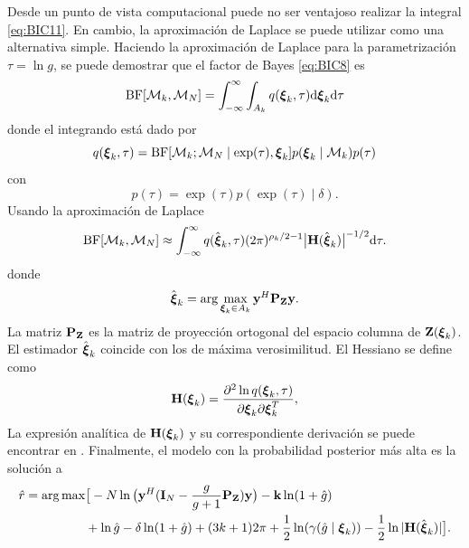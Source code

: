 Desde un punto de vista computacional puede no ser ventajoso realizar la integral \eqref{eq:BIC11}. En cambio, la aproximación de Laplace se puede utilizar como una alternativa simple. Haciendo la aproximación de Laplace para la parametrización $\tau = \ln g$, se puede demostrar que el factor de Bayes \eqref{eq:BIC8} es \cite{Nielsen2013}
\begin{equation}
	\mathrm{BF}[\mathcal{M}_k,\mathcal{M}_N] = \int_{-\infty}^{\infty}\int_{A_k}q(\boldsymbol{\xi}_k,\tau)\mathrm{d}\boldsymbol{\xi}_k\mathrm{d}\tau
\end{equation}
donde el integrando está dado por
\begin{equation}
	q(\boldsymbol{\xi}_k,\tau) = \mathrm{BF}[\mathcal{M}_k;\mathcal{M}_N\mid \exp(\tau),\boldsymbol{\xi}_k]p(\boldsymbol{\xi}_k\mid\mathcal{M}_k)p(\tau)
	\label{eq:BIC12}
\end{equation}
con
\[p(\tau) = \exp(\tau)p(\exp(\tau)\mid\delta).\]
Usando la aproximación de Laplace
\begin{equation}
	\mathrm{BF}[\mathcal{M}_k,\mathcal{M}_N] \approx \int_{-\infty}^{\infty} q(\hat{\boldsymbol{\xi}}_k,\tau)(2\pi)^{\rho_k/2-1}\big|\mathbf{H}(\hat{\boldsymbol{\xi}}_k)\big|^{-1/2}\mathrm{d}\tau.
	\label{eq:BIC13} 
\end{equation}
donde 
\begin{equation}
	\hat{\boldsymbol{\xi}}_k = \arg\max_{\boldsymbol{\xi}_k\in A_k}\mathbf{y}^H\mathbf{P}_{\mathbf{Z}}\mathbf{y}.
	\label{Eq:BIC16}
\end{equation}
La matriz $\mathbf{P}_{\mathbf{Z}}$ es la matriz de proyección ortogonal del espacio columna de $\mathbf{Z}(\boldsymbol{\xi}_k)$. El estimador $\hat{\boldsymbol{\xi}}_k$ coincide con los de máxima verosimilitud. El Hessiano se define como
\begin{equation}
	\mathbf{H}(\boldsymbol{\xi}_k) = \frac{\partial^2\ln q(\boldsymbol{\xi}_k,\tau)}{\partial\boldsymbol{\xi}_k\partial\boldsymbol{\xi}_k^T}, 
	\label{eq:BIC14}
\end{equation}
La expresión analítica de $\mathbf{H}(\boldsymbol{\xi}_k)$ y su correspondiente derivación se puede encontrar en \cite{Nielsen2013}. Finalmente, el modelo con la probabilidad posterior más alta es la solución a
\begin{equation}
	\begin{aligned}
		\hat{r} = \arg\max &\big[ -N\ln\big(\mathbf{y}^H(\mathbf{I}_N-\frac{g}{g+1}\mathbf{P}_{\mathbf{Z}})\mathbf{y}\big)-\mathbf{k}\ln(1+\hat{g})\\ & +  \ln\hat{g} - \delta\ln(1+\hat{g}) + (3k+1)2\pi + \frac{1}{2}\ln(\gamma(\hat{g}\mid\boldsymbol{\xi}_k)) - \frac{1}{2}\ln|\mathbf{H}(\hat{\boldsymbol{\xi}}_k)|\big].
	\end{aligned}
	\label{Eq:BIC15}
\end{equation}

